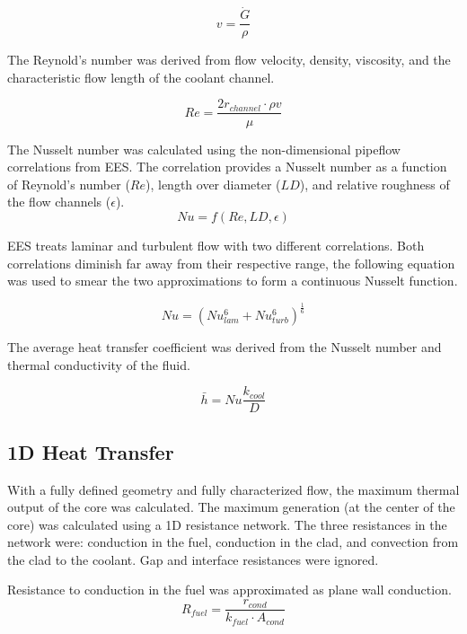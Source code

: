 \begin{equation}
    v = \frac{\dot{G}}{\rho}
\end{equation}

The Reynold's number was derived from flow velocity, density, viscosity, and the
characteristic flow length of the coolant channel.

\begin{equation}
    Re = \frac{2r_{channel}\cdot \rho v }{\mu}
\end{equation}

The Nusselt number was calculated using the non-dimensional pipeflow
correlations from EES. The correlation provides a Nusselt number as a function
of Reynold's number ($Re$), length over diameter ($LD$), and relative roughness
of the flow channels ($\epsilon$).
\begin{equation}
    Nu = f(Re, LD, \epsilon)
\end{equation}

EES treats laminar and turbulent flow with two different correlations. 
Both correlations diminish far away from their respective
range, the following equation was used to smear the two approximations to form a
continuous Nusselt function.

\begin{equation}
    Nu = (Nu_{lam}^6 + Nu_{turb}^6)^{\frac{1}{6}}
\end{equation}

The average heat transfer coefficient was derived from the Nusselt number and
thermal conductivity of the fluid.

\begin{equation}
    \bar{h} = Nu \frac{k_{cool}}{D}
\end{equation}

\subsection{1D Heat Transfer}

With a fully defined geometry and fully characterized flow, the maximum thermal
output of the core was calculated. The maximum generation (at the center of the
core) was calculated using a 1D resistance network. The three resistances in the
network were: conduction in the fuel, conduction in the clad, and convection from
the clad to the coolant. Gap and interface resistances were ignored.

Resistance to conduction in the fuel was approximated as plane wall conduction.
\begin{equation}
    R_{fuel} =  \frac{r_{cond}}{k_{fuel}\cdot A_{cond}}
\end{equation}

